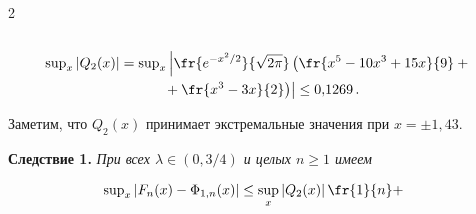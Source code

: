 \begin{multicols}{2}
\begin{center}
{\begin{tabular}{|c|c|c|}
\hline 


\end{tabular}


}


\end{center}







\smallskip


\addtocounter{table}{1}













\noindent


\begin{multline*} 


\sup\nolimits_x|Q_2(x)|=\sup\nolimits_x \left|\fr{e^{-x^2/2}}{\sqrt{2\pi}}


  \left( \fr{x^5 -10x^3+15x}{9}+{}\right.\right.\\


\left.\left.  {}+\fr{x^3-3x}{2}\right)\right|\leq 0{,}1269\,.


  \end{multline*}


Заметим, что $Q_2(x)$ принимает экстремальные значения при   $x=\pm 1{,}43$.





\smallskip





\noindent


\textbf{Следствие 1.} \textit{При всех $\lambda \in (0,3/4)$  и целых $n\geq 1$ имеем}





\vspace*{-3pt}





\noindent


\begin{multline}


\!\! \!\!\!\sup\nolimits_x \left\vert F_n(x) - \Phi_{1,n}(x)\right\vert


  \leq \sup_x \left\vert Q_2(x)\right\vert  \fr{1}{n} + 



\end{multline}
\end{multicols}
